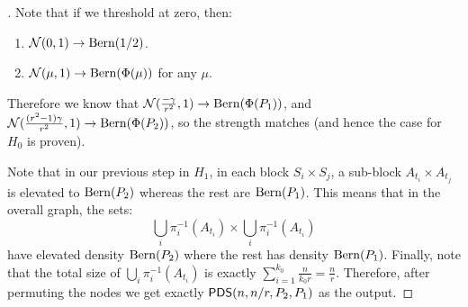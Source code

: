 \documentclass[final,12pt]{colt2023} %
\newcommand\1[1]{\mathbb{I}_{\left\{#1\right\}}}
\begin{document}
\begin{proof}[]
Note that if we threshold at zero, then:
\begin{enumerate}
    \item $\mathcal{N}(0, 1)\to {\rm Bern}(1/2)$. 
    \item $\mathcal{N}(\mu, 1)\to {\rm Bern}(\Phi(\mu))$ for any $\mu$.
\end{enumerate}
Therefore we know that $\mathcal{N}(\frac{-\gamma}{r^2}, 1)\to {\rm Bern}(\Phi(P_1))$, and $\mathcal{N}(\frac{(r^2-1)\gamma}{r^2}, 1)\to {\rm Bern}(\Phi(P_2))$, so the strength matches (and hence the case for $H_0$ is proven).

\spac Note that in our previous step in $H_1$, in each block $S_i\times S_j$, a sub-block $A_{t_i}\times A_{t_j}$ is elevated to ${\rm Bern}(P_2)$ whereas the rest are ${\rm Bern}(P_1)$. This means that in the overall graph, the sets:
$$\bigcup_i \pi_i^{-1}(A_{t_i})\times \bigcup_i \pi_i^{-1}(A_{t_i})$$have elevated density ${\rm Bern}(P_2)$ where the rest has density ${\rm Bern}(P_1)$. Finally, note that the total size of $\bigcup_i \pi_i^{-1}(A_{t_i})$ is exactly $\sum_{i=1}^{k_0}\frac{n}{k_0r}=\frac{n}{r}$. Therefore, after permuting the nodes we get exactly $\mathsf{PDS}(n, n/r, P_2, P_1)$ as the output.
\end{proof}
\end{document}

